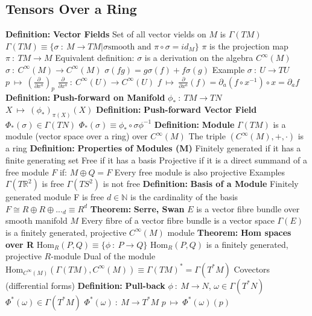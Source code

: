 \documentclass[14pt]{extarticle}
\def\Definition{{\color{blue} \textbf{Definition:} }}
\def\Theorem{{\color{red} \textbf{Theorem:} }}
\begin{document}
\begin{outline}
	\section*{Tensors Over a Ring}
		\1	\Definition \textbf{Vector Fields}
			\2	Set of all vector vields on $M$ is $\Gamma(TM)$
			\2	$\Gamma(TM) \equiv \{ \sigma~:~M \rightarrow TM | \sigma 
					 \text{smooth and } \pi \circ \sigma = id_{M}\}$
				\3	$\pi$ is the projection map $\pi~:~TM \rightarrow M$
			\2	Equivalent definition:
				\3	$\sigma$ is a derivation on the algebra $C^{\infty}(M)$
				\3	$\sigma~:~C^{\infty}(M) \rightarrow C^{\infty}(M)$
				\3	$\sigma(fg) = g\sigma(f) + f\sigma(g)$
			\2	Example
				\3	$\sigma~:~U \rightarrow TU$
				\3	$p~\mapsto~(\frac{\partial}{\partial x^a})_p$
				\3	$\frac{\partial}{\partial x^a}~:~C^{\infty}(U) \rightarrow C^{\infty}(U)$
				\3	$f~\mapsto~\frac{\partial}{\partial x^a}(f) = \partial_a(f \circ x^{-1}) \circ x = \partial_a f$
		\1	\Definition \textbf{Push-forward on Manifold}
			\2	$\phi_*~:~TM \rightarrow TN$
			\2	$X~\mapsto~(\phi_*)_{\pi(X)}(X)$
		\1	\Definition \textbf{Push-forward Vector Field}
			\2	$\Phi_*(\sigma) \in \Gamma(TN)$	
			\2	$\Phi_*(\sigma) \equiv \phi_* \circ \sigma \phi^{-1}$
		\1	\Definition \textbf{Module}
			\2	$\Gamma(TM)$ is a module (vector space over a ring) over $C^{\infty}(M)$
			\2	The triple $(C^{\infty}(M),+,\cdot)$ is a ring
		\1	\Definition \textbf{Properties of Modules (M)}
			\2	Finitely generated if it has a finite generating set
			\2	Free if it has a basis
			\2	Projective if it is a direct summand of a free module $F$ if:
				\3	$M \oplus Q = F$
				\3	Every free module is also projective
			\2	Examples
				\3	$\Gamma(T\mathbb{R}^2)$ is free
				\3	$\Gamma(TS^2)$ is not free
		\1	\Definition \textbf{Basis of a Module}
			\2	Finitely generated module F is free
			\2	$d \in \mathbb{N}$ is the cardinality of the basis
			\2	$F \cong R \oplus R \oplus ..._d \equiv R^d$
		\1	\Theorem \textbf{Serre, Swan}
			\2	$E$ is a vector fibre bundle over smooth manifold $M$
				\3	Every fibre of a vector fibre bundle is a vector space
			\2	$\Gamma(E)$ is a finitely generated, projective $C^{\infty}(M)$ module
		\1	\Theorem \textbf{Hom spaces over R}
			\2	$\text{Hom}_R(P,Q) \equiv \{\phi~:~P \rightarrow Q\}$
			\2	$\text{Hom}_R(P,Q)$ is a finitely generated, projective $R$-module
			\2	Dual of the module
				\3	$\text{Hom}_{C^{\infty}(M)}(\Gamma(TM),C^{\infty}(M)) \equiv \Gamma(TM)^* = \Gamma(T^*M)$
				\3	Covectors (differential forms)
		\1	\Definition \textbf{Pull-back}
			\2	$\phi~:~M \rightarrow N$, $\omega \in \Gamma(T^*N)$
			\2	$\Phi^*(\omega) \in \Gamma(T^*M)$
			\2	$\Phi^*(\omega)~:~M \rightarrow T^*M$
			\2	$p~\mapsto~\Phi^*(\omega)(p)$
	

\end{outline}
\end{document}

